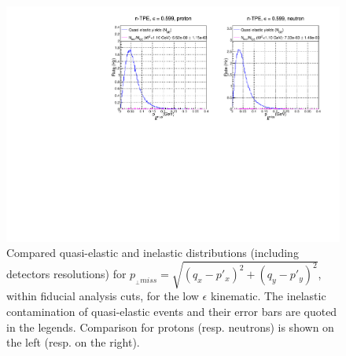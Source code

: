 \documentclass[11pt]{article}
\begin{document}
\begin{figure}[!h]
  \centering
    \includegraphics[width=12cm]{gen-tpe_le_pperp_acc_real_new.pdf}
    \caption{Compared quasi-elastic and inelastic distributions (including detectors resolutions) for $p_{_{\perp} miss} = \sqrt{(q_{x}-p'_{x})^2+(q_{y}-p'_{y})^2}$, within fiducial analysis cuts, for the low $\epsilon$ kinematic. The inelastic contamination of quasi-elastic events and their error bars are quoted in the legends. Comparison for protons (resp. neutrons) is shown on the left (resp. on the right).}%
    \label{fig:inel_contam_le}
\end{figure}
%
\end{document}
